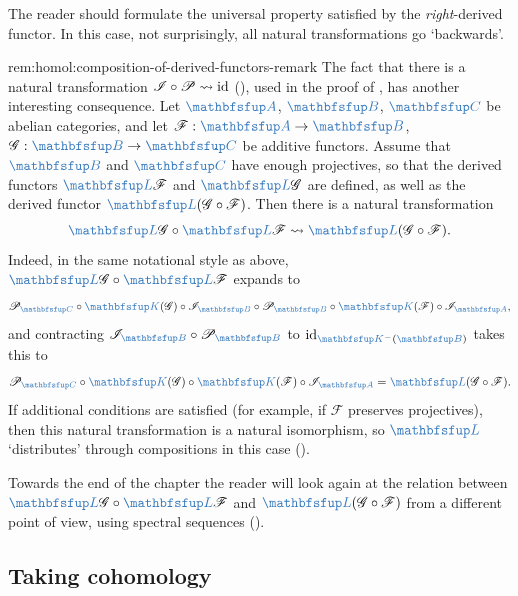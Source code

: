 The reader should formulate the universal property satisfied by the
\emph{right}-derived functor. In this case, not surprisingly, all
natural transformations go `backwards'.

\begin{rem}{}{rem:homol:composition-of-derived-functors-remark}
  The fact that there is a natural transformation
  $\mathscr{I} \circ \mathscr{P} \rightsquigarrow \operatorname{id}$
  (), used in the
  proof of , has another interesting
  consequence. Let $\categ{A}$, $\categ{B}$, $\categ{C}$ be abelian
  categories, and let $\mathscr{F} : \categ{A} \to \categ{B}$,
  $\mathscr{G} : \categ{B} \to \categ{C}$ be additive functors. Assume
  that $\categ{B}$ and $\categ{C}$ have enough projectives, so that
  the derived functors $\categ{L}\mathscr{F}$ and
  $\categ{L}\mathscr{G}$ are defined, as well as the derived functor
  $\categ{L}(\mathscr{G} \circ \mathscr{F})$. Then there is a natural
  transformation
  \[
    \categ{L}\mathscr{G} \circ \categ{L}\mathscr{F} \rightsquigarrow
    \categ{L}(\mathscr{G} \circ \mathscr{F}).
  \]
  Indeed, in the same notational style as above,
  $\categ{L}\mathscr{G} \circ \categ{L}\mathscr{F}$ expands to
  \[
    \mathscr{P}_{\categ{C}} \circ \categ{K}(\mathscr{G}) \circ
    \mathscr{I}_{\categ{B}} \circ \mathscr{P}_{\categ{B}} \circ
    \categ{K}(\mathscr{F}) \circ \mathscr{I}_{\categ{A}},
  \]
  and contracting
  $\mathscr{I}_{\categ{B}} \circ \mathscr{P}_{\categ{B}}$ to
  $\id_{\categ{K}^-(\categ{B})}$ takes this to
  \[
    \mathscr{P}_{\categ{C}} \circ \categ{K}(\mathscr{G}) \circ
    \categ{K}(\mathscr{F}) \circ \mathscr{I}_{\categ{A}} =
    \categ{L}(\mathscr{G} \circ \mathscr{F}).
  \]
  If additional conditions are satisfied (for example, if
  $\mathscr{F}$ preserves projectives), then this natural
  transformation is a natural isomorphism, so $\categ{L}$
  `distributes' through compositions in this case
  ().

  Towards the end of the chapter the reader will look again at the
  relation between $\categ{L}\mathscr{G} \circ \categ{L}\mathscr{F}$
  and $\categ{L}(\mathscr{G} \circ \mathscr{F})$ from a different
  point of view, using spectral sequences
  ().
\end{rem}

\subsection{Taking cohomology}
\label{subsec:homol:taking-cohomology}

